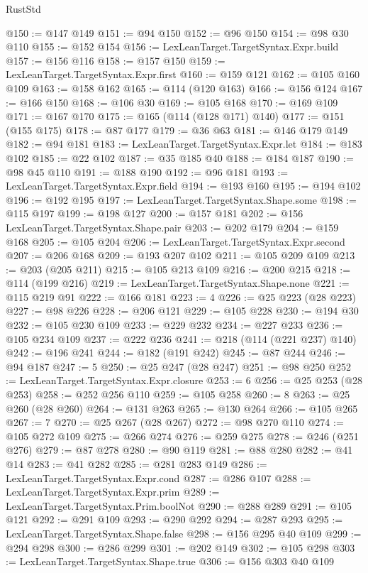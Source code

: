 \begin{lexlean}{RustStd}
\begin{coremodule}
@150 := @147 @149
@151 := @94 @150
@152 := @96 @150
@154 := @98 @30 @110
@155 := @152 @154
@156 := LexLeanTarget.TargetSyntax.Expr.build
@157 := @156 @116
@158 := @157 @150
@159 := LexLeanTarget.TargetSyntax.Expr.first
@160 := @159 @121
@162 := @105 @160 @109
@163 := @158 @162
@165 := @114 (@120 @163)
@166 := @156 @124
@167 := @166 @150
@168 := @106 @30
@169 := @105 @168
@170 := @169 @109
@171 := @167 @170
@175 := @165 (@114 (@128 @171) @140)
@177 := @151 (@155 @175)
@178 := @87 @177
@179 := @36 @63
@181 := @146 @179 @149
@182 := @94 @181
@183 := LexLeanTarget.TargetSyntax.Expr.let
@184 := @183 @102
@185 := @22 @102
@187 := @35 @185 @40
@188 := @184 @187
@190 := @98 @45 @110
@191 := @188 @190
@192 := @96 @181
@193 := LexLeanTarget.TargetSyntax.Expr.field
@194 := @193 @160
@195 := @194 @102
@196 := @192 @195
@197 := LexLeanTarget.TargetSyntax.Shape.some
@198 := @115 @197
@199 := @198 @127
@200 := @157 @181
@202 := @156 LexLeanTarget.TargetSyntax.Shape.pair
@203 := @202 @179
@204 := @159 @168
@205 := @105 @204
@206 := LexLeanTarget.TargetSyntax.Expr.second
@207 := @206 @168
@209 := @193 @207 @102
@211 := @105 @209 @109
@213 := @203 (@205 @211)
@215 := @105 @213 @109
@216 := @200 @215
@218 := @114 (@199 @216)
@219 := LexLeanTarget.TargetSyntax.Shape.none
@221 := @115 @219 @91
@222 := @166 @181
@223 := 4
@226 := @25 @223 (@28 @223)
@227 := @98 @226
@228 := @206 @121
@229 := @105 @228
@230 := @194 @30
@232 := @105 @230 @109
@233 := @229 @232
@234 := @227 @233
@236 := @105 @234 @109
@237 := @222 @236
@241 := @218 (@114 (@221 @237) @140)
@242 := @196 @241
@244 := @182 (@191 @242)
@245 := @87 @244
@246 := @94 @187
@247 := 5
@250 := @25 @247 (@28 @247)
@251 := @98 @250
@252 := LexLeanTarget.TargetSyntax.Expr.closure
@253 := 6
@256 := @25 @253 (@28 @253)
@258 := @252 @256 @110
@259 := @105 @258
@260 := 8
@263 := @25 @260 (@28 @260)
@264 := @131 @263
@265 := @130 @264
@266 := @105 @265
@267 := 7
@270 := @25 @267 (@28 @267)
@272 := @98 @270 @110
@274 := @105 @272 @109
@275 := @266 @274
@276 := @259 @275
@278 := @246 (@251 @276)
@279 := @87 @278
@280 := @90 @119
@281 := @88 @280
@282 := @41 @14
@283 := @41 @282
@285 := @281 @283 @149
@286 := LexLeanTarget.TargetSyntax.Expr.cond
@287 := @286 @107
@288 := LexLeanTarget.TargetSyntax.Expr.prim
@289 := LexLeanTarget.TargetSyntax.Prim.boolNot
@290 := @288 @289
@291 := @105 @121
@292 := @291 @109
@293 := @290 @292
@294 := @287 @293
@295 := LexLeanTarget.TargetSyntax.Shape.false
@298 := @156 @295 @40 @109
@299 := @294 @298
@300 := @286 @299
@301 := @202 @149
@302 := @105 @298
@303 := LexLeanTarget.TargetSyntax.Shape.true
@306 := @156 @303 @40 @109

\end{coremodule}
\end{lexlean}
